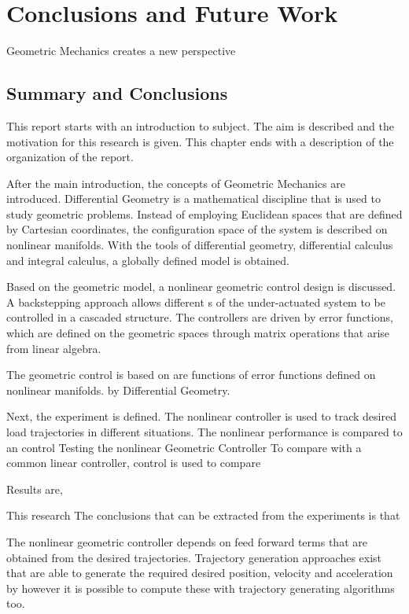 \chapter{Conclusions and Future Work}\label{ch:conclusion}

Geometric Mechanics creates a new perspective 

\section{Summary and Conclusions}
This report starts with an introduction to subject. The aim is described and the motivation for this research is given. 
This chapter ends with a description of the organization of the report. 

After the main introduction, the concepts of Geometric Mechanics are introduced. 
Differential Geometry is a mathematical discipline that is used to study geometric problems. 
Instead of employing Euclidean spaces that are defined by Cartesian coordinates, the configuration space of the system is described on nonlinear manifolds.
With the tools of differential geometry, differential calculus and integral calculus, a globally defined model is obtained.

Based on the geometric model, a nonlinear geometric control design is discussed.  
A backstepping approach allows different s of the under-actuated system to be controlled in a cascaded structure. 
The controllers are driven by error functions, which are defined on the geometric spaces through matrix operations that arise from linear algebra.


The geometric control is based on 
 are functions
of error functions defined on nonlinear manifolds.
by Differential Geometry. 

Next, the experiment is defined. The nonlinear controller is used to track desired load trajectories in different situations. The nonlinear performance is compared to an  control 
Testing the nonlinear Geometric Controller
To compare with a common linear controller,  control is used to compare

Results are,

This research 
The conclusions that can be extracted from the experiments is that 

The nonlinear geometric controller depends on feed forward terms that are obtained from the desired trajectories. 
Trajectory generation approaches exist that are able to generate the required desired position, velocity and acceleration by 
however it is possible to compute these with trajectory generating algorithms too.




